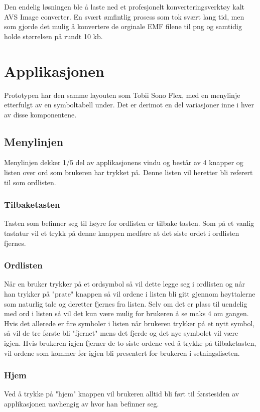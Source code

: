 { 
Den endelig løsningen ble å laste ned et profesjonelt konverteringsverktøy kalt AVS Image converter. En svært ømfintlig prosess som tok svært lang tid, men som gjorde det mulig å konvertere de orginale EMF filene til png og samtidig holde størrelsen på rundt 10 kb. 
 
 
\section{Applikasjonen} 

Prototypen har den samme layouten som Tobii Sono Flex, med en menylinje etterfulgt av en symboltabell under. Det er derimot en del variasjoner inne i hver av disse komponentene. 
 
 
\subsection{Menylinjen} 
 
Menylinjen dekker 1/5 del av applikasjonens vindu og består av 4 knapper og listen over ord som brukeren har trykket på. Denne listen vil heretter bli referert til som ordlisten. 
 
 
\subsubsection{Tilbaketasten} 
 
Tasten som befinner seg til høyre for ordlisten er tilbake tasten. Som på et vanlig tastatur vil et trykk på denne knappen medføre at det siste ordet i ordlisten fjernes. 
 
 
\subsubsection{Ordlisten} 
 
Når en bruker trykker på et ordsymbol så vil dette legge seg i ordlisten og når han trykker på "prate" knappen så vil ordene i listen bli gitt gjennom høyttalerne som naturlig tale og deretter fjernes fra listen. Selv om det er plass til uendelig med ord i listen så vil det kun være mulig for brukeren å se maks 4 om gangen. Hvis det allerede er fire symboler i listen når brukeren trykker på et nytt symbol, så vil de tre første bli "fjernet" mens det fjerde og det nye symbolet vil være igjen. Hvis brukeren igjen fjerner de to siste ordene ved å trykke på tilbaketasten,  vil ordene som kommer før igjen bli presentert for brukeren i setningsliseten.  
 
 
\subsubsection{Hjem} 
Ved å trykke på "hjem" knappen vil brukeren alltid bli ført til førstesiden av applikasjonen uavhengig av hvor han befinner seg.  
 
}
